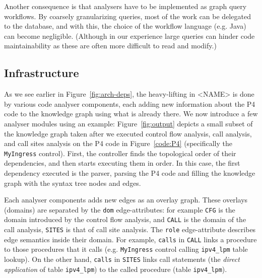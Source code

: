 \documentclass[sigconf]{acmart}
\begin{document}
  Another consequence is that analysers have to be implemented as graph query workflows. By coarsely granularizing queries, most of the work can be delegated to the database, and with this, the choice of the workflow language (e.g. Java) can become negligible. 
(Although in our experience large queries can hinder code maintainability as these are often more difficult to read and modify.)

	
  \subsection{Infrastructure}\label{sec:infra} %
  As we see earlier in Figure~\ref{fig:arch-deps}, the heavy-lifting in <NAME> is done by various code analyser components, each adding new information about the P4 code to the knowledge graph using what is already there. We now introduce a few analyser modules using an example: Figure~\ref{fig:output} depicts a small subset of the knowledge graph taken after we executed control flow analysis, call analysis, and call sites analysis on the P4 code in Figure~\ref{code:P4} (specifically the \texttt{MyIngress} control). 
  First, the controller finds the topological order of their dependencies, and then starts executing them in order. In this case, the first dependency executed is the parser, parsing the P4 code and filling the knowledge graph with the syntax tree nodes and edges. 

  Each analyser components adds new edges as an overlay graph. These overlays (domains) are separated by the \texttt{dom} edge-attributes: for example \texttt{CFG} is the domain introduced by the control flow analysis, and \texttt{CALL} is the domain of the call analysis, \texttt{SITES} is that of call site analysis. The \texttt{role} edge-attribute describes edge semantics inside their domain. For example, \texttt{calls} in \texttt{CALL} links a procedure to those procedures that it calls (e.g. \texttt{MyIngress} control calling \texttt{ipv4\_lpm} table lookup). On the other hand, \texttt{calls} in \texttt{SITES} links call statements (the \textit{direct application} of table \texttt{ipv4\_lpm}) to the called procedure (table \texttt{ipv4\_lpm}). 
  
\end{document}
